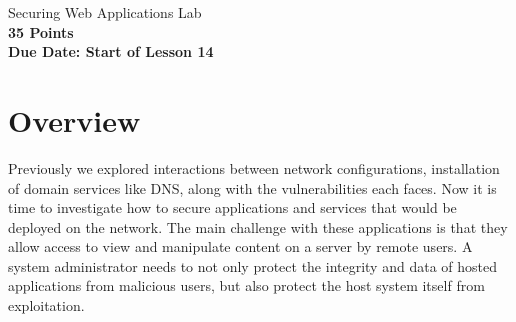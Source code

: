 \documentclass{article}
\begin{document}
\begin{center}
{\LARGE Securing Web Applications Lab}\\
\textbf{35 Points }\\
\textbf{Due Date: Start of Lesson 14}
\end{center}
\copyrightnoticeA

\setcounter{task}{1}
\newcommand{\tasks} {\bf {\noindent (\arabic{task})} \addtocounter{task}{1} \,}


\section{Overview}

Previously we explored interactions between network configurations, 
installation of domain services like DNS, along with the vulnerabilities each 
faces.  Now it is time to investigate how to secure applications and services that 
would be deployed on the network.  The main challenge with these applications is
that they allow access to view and manipulate content on a server by remote users.  A system administrator needs to not only protect the 
integrity and data of hosted applications from malicious users, but also  
protect the host system itself from exploitation.
\end{document}
